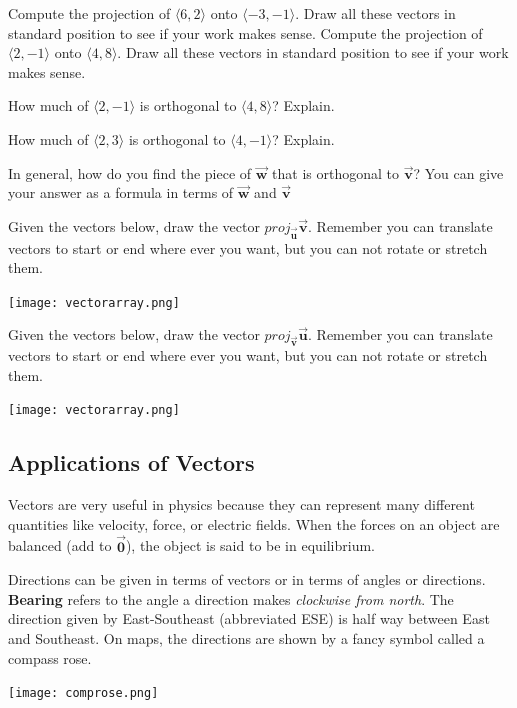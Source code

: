 \bq Compute the projection of $\langle 6,2\rangle$ onto $\langle -3,-1\rangle$. Draw all these vectors in standard position to see if your work makes sense.
\eq
\bq Compute the projection of $\langle 2,-1\rangle$ onto $\langle 4,8\rangle$. Draw all these vectors in standard position to see if your work makes sense.
\eq

\bq How much of $\langle 2,-1\rangle$ is orthogonal to $\langle 4,8\rangle$? Explain.
\eq

\bq How much of $\langle 2,3\rangle$ is orthogonal to $\langle 4,-1\rangle$? Explain.
\eq

\bq In general, how do you find the piece of $\vec{\textbf{w}}$ that is orthogonal to $\vec{\textbf{v}}$? You can give your answer as a formula in terms of $\vec{\textbf{w}}$ and $\vec{\textbf{v}}$
\eq

\bq Given the vectors below, draw the vector $proj_{\vec{\textbf{u}}} \vec{\textbf{v}}$. Remember you can translate vectors to start or end where ever you want, but you can not rotate or stretch them.

\begin{center} \texttt{[image: vectorarray.png]} \end{center}
\eq
\bq Given the vectors below, draw the vector $proj_{\vec{\textbf{v}}} \vec{\textbf{u}}$. Remember you can translate vectors to start or end where ever you want, but you can not rotate or stretch them.

\begin{center} \texttt{[image: vectorarray.png]} \end{center}
\eq

\subsection{Applications of Vectors}

\begin{info} Vectors are very useful in physics because they can represent many different quantities like velocity, force, or electric fields. When the forces on an object are balanced (add to $\vec{\textbf{0}}$), the object is said to be in equilibrium.

Directions can be given in terms of vectors or in terms of angles or directions. \textbf{Bearing} refers to the angle a direction makes \emph{clockwise from north}. The direction given by East-Southeast (abbreviated ESE) is half way between East and Southeast. On maps, the directions are shown by a fancy symbol called a compass rose.

\begin{center} \texttt{[image: comprose.png]} \end{center}
\end{info}

